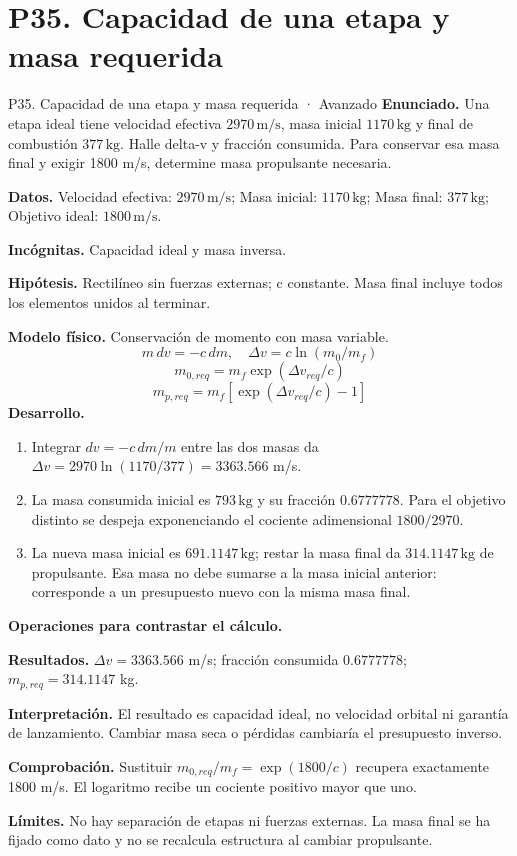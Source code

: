 \section{P35. Capacidad de una etapa y masa requerida}
\begin{studiumworked}{P35. Capacidad de una etapa y masa requerida · Avanzado}
\textbf{Enunciado.} Una etapa ideal tiene velocidad efectiva $2970\,\mathrm{m/s}$, masa inicial $1170\,\mathrm{kg}$ y final de combustión $377\,\mathrm{kg}$. Halle delta-v y fracción consumida. Para conservar esa masa final y exigir 1800 m/s, determine masa propulsante necesaria.

\textbf{Datos.} Velocidad efectiva: $2970\,\mathrm{m/s}$; Masa inicial: $1170\,\mathrm{kg}$; Masa final: $377\,\mathrm{kg}$; Objetivo ideal: $1800\,\mathrm{m/s}$.

\textbf{Incógnitas.} Capacidad ideal y masa inversa.

\textbf{Hipótesis.} Rectilíneo sin fuerzas externas; c constante. Masa final incluye todos los elementos unidos al terminar.

\textbf{Modelo físico.} Conservación de momento con masa variable.
\[m\,dv=-c\,dm,\quad \Delta v=c\ln(m_0/m_f)\]
\[m_{0,req}=m_f\exp(\Delta v_{req}/c)\]
\[m_{p,req}=m_f[\exp(\Delta v_{req}/c)-1]\]
\textbf{Desarrollo.}
\begin{enumerate}
\item Integrar $dv=-c\,dm/m$ entre las dos masas da $\Delta v=2970\ln(1170/377)=3363.566$ m/s.
\item La masa consumida inicial es $793\,\mathrm{kg}$ y su fracción $0.6777778$. Para el objetivo distinto se despeja exponenciando el cociente adimensional $1800/2970$.
\item La nueva masa inicial es $691.1147\,\mathrm{kg}$; restar la masa final da $314.1147\,\mathrm{kg}$ de propulsante. Esa masa no debe sumarse a la masa inicial anterior: corresponde a un presupuesto nuevo con la misma masa final.
\end{enumerate}
\textbf{Operaciones para contrastar el cálculo.}

\textbf{Resultados.} $\Delta v=3363.566$ m/s; fracción consumida $0.6777778$; $m_{p,req}=314.1147$ kg.

\textbf{Interpretación.} El resultado es capacidad ideal, no velocidad orbital ni garantía de lanzamiento. Cambiar masa seca o pérdidas cambiaría el presupuesto inverso.

\textbf{Comprobación.} Sustituir $m_{0,req}/m_f=\exp(1800/c)$ recupera exactamente 1800 m/s. El logaritmo recibe un cociente positivo mayor que uno.

\textbf{Límites.} No hay separación de etapas ni fuerzas externas. La masa final se ha fijado como dato y no se recalcula estructura al cambiar propulsante.
\end{studiumworked}
